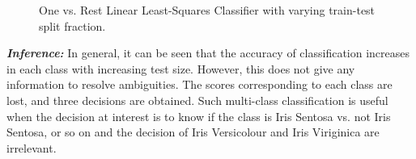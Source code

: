 \documentclass[12pt, a4 paper]{article}
\begin{document}
\begin{figure}

\caption{One vs. Rest Linear Least-Squares Classifier with varying train-test split fraction.}
\label{fig:LSOA_Iris}
\end{figure}

{\it \bfseries Inference:} In general, it can be seen that the accuracy of classification increases in each class with increasing test size. However, this does not give any information to resolve ambiguities. The scores corresponding to each class are lost, and three decisions are obtained. Such multi-class classification is useful when the decision at interest is to know if the class is Iris Sentosa vs. not Iris Sentosa, or so on and the decision of Iris Versicolour and Iris Viriginica are irrelevant.

\end{document}
